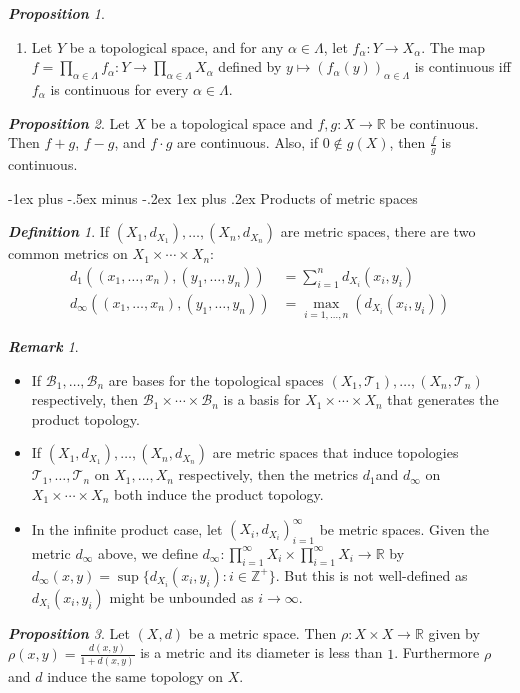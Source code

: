 \documentclass[frenchspacing,9pt,landscape,a4paper]{article}
\makeatletter
\renewcommand{\subsubsection}{\@startsection{subsubsection}{3}{0mm}%
                                {-1ex plus -.5ex minus -.2ex}%
                                {1ex plus .2ex}%
                                {\normalfont\small\bfseries}}
\newcommand{\BR}{\mathbb R}
\newcommand{\BZ}{\mathbb Z}
\theoremstyle{remark}
\newtheorem*{defn}{\textbf{Definition}}
\newtheorem*{prop}{\textbf{Proposition}}
\newtheorem*{rem}{\textbf{Remark}}
\makeatother
\begin{document}
\begin{multicols}{4}
\begin{prop}
\begin{enumerate}
         \item Let  $Y$ be a topological space, and for any  $\alpha\in\Lambda$, let  $f_\alpha:Y\to
             X_\alpha$. The map  $f=\prod_{\alpha\in\Lambda} f_\alpha:Y\to\prod_{\alpha\in\Lambda}X_\alpha$
             defined by  $y\mapsto(f_\alpha(y))_{\alpha\in\Lambda}$ is continuous iff  $f_\alpha$ is
             continuous for every  $\alpha\in\Lambda$.
    \end{enumerate}
\end{prop}
\begin{prop}
    Let $X$ be a topological space and  $f,g:X\to\BR$ be continuous. Then  $f+g$,  $f-g$, and  $f\cdot g$
    are continuous. Also, if  $0\notin g(X)$, then  $\frac{f}{g}$ is continuous.
\end{prop}
\subsubsection{Products of metric spaces}
\begin{defn}
    If $(X_1,d_{X_1}),\dots,(X_n,d_{X_n})$ are metric spaces, there are two common metrics on
    $X_1\times\cdots\times X_n$:
    \begin{align*}
        d_1((x_1,\dots,x_n),(y_1,\dots,y_n))&=\sum_{i=1}^n d_{X_i}(x_i,y_i)\\
        d_\infty((x_1,\dots,x_n),(y_1,\dots,y_n))&=\max_{i=1,\dots,n}(d_{X_i}(x_i,y_i)) 
    \end{align*}
\end{defn}
\begin{rem}
    \begin{itemize}
        \item If $\mathcal{B}_1,\dots,\mathcal{B}_n$ are bases for the topological spaces
            $(X_1,\mathcal{T}_1),\dots,(X_n,\mathcal{T}_n)$ respectively, then
            $\mathcal{B}_1\times\cdots\times\mathcal{B}_n$ is a basis for  $X_1\times\cdots\times X_n$
            that generates the product topology.
        \item If $(X_1,d_{X_1}),\dots,(X_n,d_{X_n})$ are metric spaces that induce topologies
            $\mathcal{T}_1,\dots,\mathcal{T}_n$ on  $X_1,\dots,X_n$ respectively, then the metrics $d_1
            $and $d_\infty$ on  $X_1\times\cdots\times X_n$ both induce the product topology.
        \item In the infinite product case, let $(X_i,d_{X_i})_{i=1}^\infty$ be metric spaces. Given the
            metric  $d_\infty$ above, we define  $d_\infty:\prod_{i=1}^\infty X_i\times\prod_{i=1}^\infty
            X_i\to\BR$ by  $d_\infty(x,y)=\sup\{d_{X_i}(x_i,y_i):i\in\BZ^+\}$. But this is not well-defined
            as  $d_{X_i}(x_i,y_i)$ might be unbounded as  $i\to\infty$.
    \end{itemize}
\end{rem}
\begin{prop}
    Let $(X,d)$ be a metric space. Then  $\rho:X\times X\to\BR$ given by
    $\rho(x,y)=\frac{d(x,y)}{1+d(x,y)}$ is a metric and its diameter is less than $1$. Furthermore  $\rho$
    and  $d$ induce the same topology on  $X$.
\end{prop}

\end{multicols}
\end{document}
